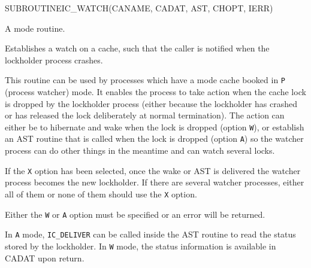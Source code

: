 \begin{routine} %
\subroutine
   {SUBROUTINE}{IC\_WATCH}{(CANAME, CADAT, AST, CHOPT, IERR)}
\begin{overview}
A \watcher mode routine.

Establishes a watch on a \watcher cache, such that the caller is
notified when the lockholder process crashes.
\end{overview}
\begin{argdeflist}
\end{argdeflist}
\begin{describe}

This routine can be used by processes which have a \watcher mode cache
booked in {\tt P} (process watcher) mode. It enables the process to
take action when the cache lock is dropped by the lockholder process
(either because the lockholder has crashed or has released the
lock deliberately at normal termination). The action can either be to
hibernate and wake when the lock is dropped (option {\tt W}),
or establish an AST
routine that is called when the lock is dropped (option {\tt A})
so the watcher process
can do other things in the meantime and can watch several locks.

If the {\tt X} option has been selected, once the wake or AST
is delivered the watcher process becomes the new lockholder. If there are
several watcher processes, either all of them or none of them should use
the {\tt X} option.

Either the {\tt W} or {\tt A} option must be specified or an error will
be returned.

In {\tt A} mode, \verb|IC_DELIVER| can be called inside the AST routine
to read the status stored by the lockholder. In {\tt W} mode, the
status information is available in CADAT upon return.


\end{describe}
\end{routine}
